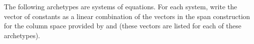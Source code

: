 The following archetypes are systems of equations.  For each system, write the vector of constants as a linear combination of the vectors in the span construction for the column space provided by  and  (these vectors are listed for each of these archetypes).\\
\\ 
\\ 
\\ 
\\
\\ 
\\ 
\\
\\ 
\\


